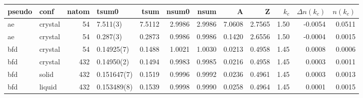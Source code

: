 \begin{tabular}{llrlrrrrrrrr}
\toprule
pseudo &     conf &  natom &          tsum0 &    tsum &   nsum0 &    nsum &       A &       Z &  $k_c$ &  $\Delta n(k_c)$ &  $n(k_c)$ \\
\midrule
    ae &  crystal &     54 &       7.511(3) &  7.5112 &  2.9986 &  2.9986 &  7.0608 &  2.7565 &   1.50 &          -0.0054 &    0.0511 \\
    ae &  crystal &     54 &       0.287(3) &  0.2873 &  0.9986 &  0.9986 &  0.1420 &  2.6556 &   1.50 &          -0.0004 &    0.0015 \\
   bfd &  crystal &     54 &     0.14925(7) &  0.1488 &  1.0021 &  1.0030 &  0.0213 &  0.4958 &   1.45 &           0.0008 &    0.0006 \\
   bfd &  crystal &    432 &     0.14950(2) &  0.1494 &  0.9983 &  0.9985 &  0.0216 &  0.4958 &   1.45 &           0.0003 &    0.0011 \\
   bfd &    solid &    432 &    0.151647(7) &  0.1519 &  0.9996 &  0.9992 &  0.0236 &  0.4961 &   1.45 &           0.0003 &    0.0013 \\
   bfd &   liquid &    432 &    0.153489(8) &  0.1539 &  0.9998 &  0.9990 &  0.0258 &  0.4964 &   1.45 &           0.0001 &    0.0015 \\
\bottomrule
\end{tabular}

